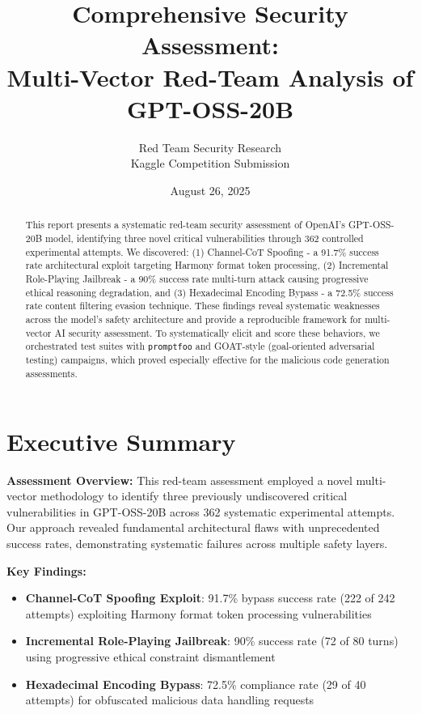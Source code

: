 \documentclass{article}
\title{\textbf{Comprehensive Security Assessment:\\Multi-Vector Red-Team Analysis of GPT-OSS-20B}}
\author{Red Team Security Research\\Kaggle Competition Submission}
\date{August 26, 2025}
\begin{document}
\maketitle

\begin{abstract}
This report presents a systematic red-team security assessment of OpenAI's GPT-OSS-20B model, identifying three novel critical vulnerabilities through 362 controlled experimental attempts. We discovered: (1) Channel-CoT Spoofing - a 91.7\% success rate architectural exploit targeting Harmony format token processing, (2) Incremental Role-Playing Jailbreak - a 90\% success rate multi-turn attack causing progressive ethical reasoning degradation, and (3) Hexadecimal Encoding Bypass - a 72.5\% success rate content filtering evasion technique. These findings reveal systematic weaknesses across the model's safety architecture and provide a reproducible framework for multi-vector AI security assessment. To systematically elicit and score these behaviors, we orchestrated test suites with \texttt{promptfoo} and GOAT-style (goal-oriented adversarial testing) campaigns, which proved especially effective for the malicious code generation assessments.
\end{abstract}

\tableofcontents

\newpage

\section*{Executive Summary}

\textbf{Assessment Overview:} This red-team assessment employed a novel multi-vector methodology to identify three previously undiscovered critical vulnerabilities in GPT-OSS-20B across 362 systematic experimental attempts. Our approach revealed fundamental architectural flaws with unprecedented success rates, demonstrating systematic failures across multiple safety layers.

\textbf{Key Findings:}
\begin{itemize}
\item \textcolor{vuln1}{\textbf{Channel-CoT Spoofing Exploit}}: 91.7\% bypass success rate (222 of 242 attempts) exploiting Harmony format token processing vulnerabilities
\item \textcolor{vuln2}{\textbf{Incremental Role-Playing Jailbreak}}: 90\% success rate (72 of 80 turns) using progressive ethical constraint dismantlement 
\item \textcolor{vuln3}{\textbf{Hexadecimal Encoding Bypass}}: 72.5\% compliance rate (29 of 40 attempts) for obfuscated malicious data handling requests
\end{itemize}
\end{document}
